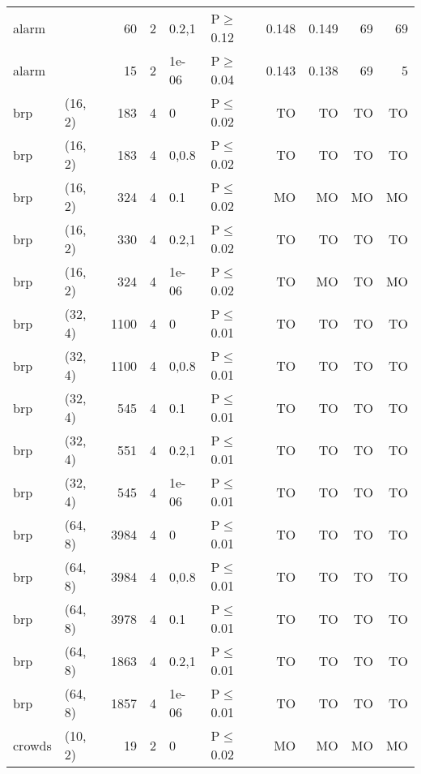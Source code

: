 \begin{longtable}{llrrllrrrr}
 alarm         &          &     	60 &   2 & 0.2,1 & P$\geq$0.12  & 0.148    & 0.149    & 69      & 69     \\
 alarm         &          &     	15 &   2 & 1e-06 & P$\geq$0.04  & 0.143    & 0.138    & 69      & 5      \\
 brp           & (16, 2)  &    	183 &   4 & 0     & P$\leq$0.02  & TO       & TO       & TO      & TO     \\
 brp           & (16, 2)  &    	183 &   4 & 0,0.8 & P$\leq$0.02  & TO       & TO       & TO      & TO     \\
 brp           & (16, 2)  &    	324 &   4 & 0.1   & P$\leq$0.02  & MO       & MO       & MO      & MO     \\
 brp           & (16, 2)  &    	330 &   4 & 0.2,1 & P$\leq$0.02  & TO       & TO       & TO      & TO     \\
 brp           & (16, 2)  &    	324 &   4 & 1e-06 & P$\leq$0.02  & TO       & MO       & TO      & MO     \\
 brp           & (32, 4)  &   	1100 &   4 & 0     & P$\leq$0.01  & TO       & TO       & TO      & TO     \\
 brp           & (32, 4)  &   	1100 &   4 & 0,0.8 & P$\leq$0.01  & TO       & TO       & TO      & TO     \\
 brp           & (32, 4)  &    	545 &   4 & 0.1   & P$\leq$0.01  & TO       & TO       & TO      & TO     \\
 brp           & (32, 4)  &    	551 &   4 & 0.2,1 & P$\leq$0.01  & TO       & TO       & TO      & TO     \\
 brp           & (32, 4)  &    	545 &   4 & 1e-06 & P$\leq$0.01  & TO       & TO       & TO      & TO     \\
 brp           & (64, 8)  &   	3984 &   4 & 0     & P$\leq$0.01  & TO       & TO       & TO      & TO     \\
 brp           & (64, 8)  &   	3984 &   4 & 0,0.8 & P$\leq$0.01  & TO       & TO       & TO      & TO     \\
 brp           & (64, 8)  &   	3978 &   4 & 0.1   & P$\leq$0.01  & TO       & TO       & TO      & TO     \\
 brp           & (64, 8)  &   	1863 &   4 & 0.2,1 & P$\leq$0.01  & TO       & TO       & TO      & TO     \\
 brp           & (64, 8)  &   	1857 &   4 & 1e-06 & P$\leq$0.01  & TO       & TO       & TO      & TO     \\
 crowds        & (10, 2)  &     	19 &   2 & 0     & P$\leq$0.02  & MO       & MO       & MO      & MO     \\

\end{longtable}
